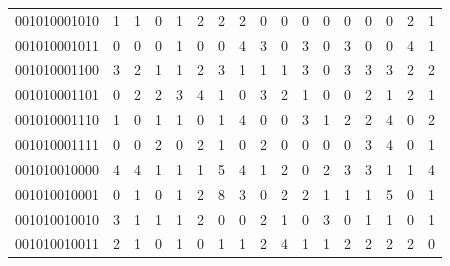 \documentclass[10pt,a4paper]{article}
\begin{document}
\begin{longtable}{ |c|c|c|c|c|c|c|c|c|c|c|c|c|c|c|c|c| }
    001010001010              & 1                            & 1                                & 0                            & 1                              & 2   & 2   & 2   & 0   & 0   & 0   & 0   & 0   & 0   & 0   & 2   & 1   \\
    001010001011              & 0                            & 0                                & 0                            & 1                              & 0   & 0   & 4   & 3   & 0   & 3   & 0   & 3   & 0   & 0   & 4   & 1   \\
    001010001100              & 3                            & 2                                & 1                            & 1                              & 2   & 3   & 1   & 1   & 1   & 3   & 0   & 3   & 3   & 3   & 2   & 2   \\
    001010001101              & 0                            & 2                                & 2                            & 3                              & 4   & 1   & 0   & 3   & 2   & 1   & 0   & 0   & 2   & 1   & 2   & 1   \\
    001010001110              & 1                            & 0                                & 1                            & 1                              & 0   & 1   & 4   & 0   & 0   & 3   & 1   & 2   & 2   & 4   & 0   & 2   \\
    001010001111              & 0                            & 0                                & 2                            & 0                              & 2   & 1   & 0   & 2   & 0   & 0   & 0   & 0   & 3   & 4   & 0   & 1   \\
    001010010000              & 4                            & 4                                & 1                            & 1                              & 1   & 5   & 4   & 1   & 2   & 0   & 2   & 3   & 3   & 1   & 1   & 4   \\
    001010010001              & 0                            & 1                                & 0                            & 1                              & 2   & 8   & 3   & 0   & 2   & 2   & 1   & 1   & 1   & 5   & 0   & 1   \\
    001010010010              & 3                            & 1                                & 1                            & 1                              & 2   & 0   & 0   & 2   & 1   & 0   & 3   & 0   & 1   & 1   & 0   & 1   \\
    001010010011              & 2                            & 1                                & 0                            & 1                              & 0   & 1   & 1   & 2   & 4   & 1   & 1   & 2   & 2   & 2   & 2   & 0   \\

\end{longtable}
\end{document}

